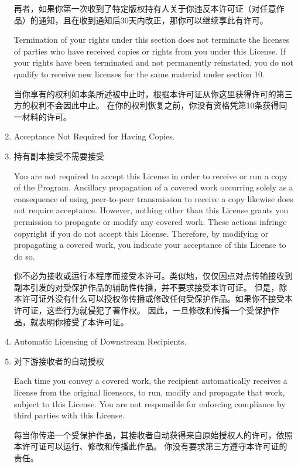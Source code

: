 \documentclass[11pt]{article}
\begin{document}
\begin{enumerate}
        再者，如果你第一次收到了特定版权持有人关于你违反本许可证（对任意作品）的通知，且在收到通知后30天内改正，那你可以继续享此有许可。

        Termination of your rights under this section does not terminate the
        licenses of parties who have received copies or rights from you under
        this License.  If your rights have been terminated and not permanently
        reinstated, you do not qualify to receive new licenses for the same
        material under section 10.

        当你享有的权利如本条所述被中止时，根据本许可证从你这里获得许可的第三方的权利不会因此中止。
        在你的权利恢复之前，你没有资格凭第10条获得同一材料的许可。

  \item Acceptance Not Required for Having Copies.
  \item 持有副本接受不需要接受

        You are not required to accept this License in order to receive or
        run a copy of the Program.  Ancillary propagation of a covered work
        occurring solely as a consequence of using peer-to-peer transmission
        to receive a copy likewise does not require acceptance.  However,
        nothing other than this License grants you permission to propagate or
        modify any covered work.  These actions infringe copyright if you do
        not accept this License.  Therefore, by modifying or propagating a
        covered work, you indicate your acceptance of this License to do so.

        你不必为接收或运行本程序而接受本许可。类似地，仅仅因点对点传输接收到副本引发的对受保护作品的辅助性传播，并不要求接受本许可证。
        但是，除本许可证外没有什么可以授权你传播或修改任何受保护作品。如果你不接受本许可证，这些行为就侵犯了著作权。
        因此，一旦修改和传播一个受保护作品，就表明你接受了本许可证。

  \item Automatic Licensing of Downstream Recipients.
  \item 对下游接收者的自动授权

        Each time you convey a covered work, the recipient automatically
        receives a license from the original licensors, to run, modify and
        propagate that work, subject to this License.  You are not responsible
        for enforcing compliance by third parties with this License.

        每当你传递一个受保护作品，其接收者自动获得来自原始授权人的许可，依照本许可证可以运行、修改和传播此作品。
        你没有要求第三方遵守本许可证的责任。


\end{enumerate}
\end{document}

